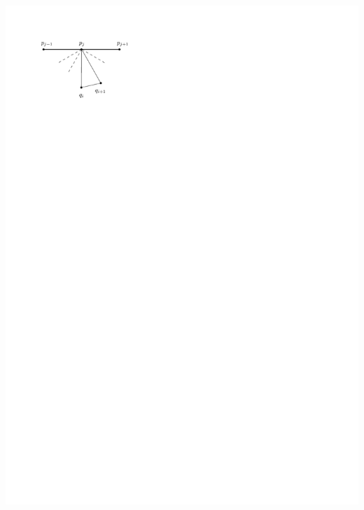 \documentclass[a4paper]{article}
\begin{document}
\includegraphics[]{unifiedAlgo/img/walkProofA}
\clearpage%
\end{document}
